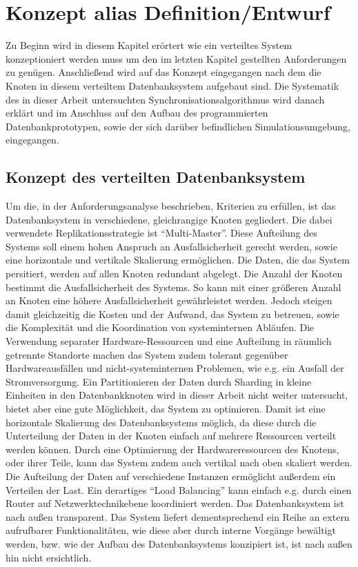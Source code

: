 \documentclass[a4paper,11pt,oneside,%
headsepline,												%
footsepline,												%
bibtotocnumbered									%
]{scrreprt}
\begin{document}
\chapter{Konzept alias Definition/Entwurf}
Zu Beginn wird in diesem Kapitel erörtert wie ein verteiltes System konzeptioniert werden muss um den im letzten Kapitel gestellten Anforderungen zu genügen. Anschließend wird auf das Konzept eingegangen nach dem die Knoten in diesem verteiltem Datenbanksystem aufgebaut sind. Die Systematik des in dieser Arbeit untersuchten Synchronisationsalgorithmus wird danach erklärt und im Anschluss auf den Aufbau des programmierten Datenbankprototypen, sowie der sich darüber befindlichen Simulationsumgebung, eingegangen.

\section{Konzept des verteilten Datenbanksystem}
\label{sec:DBSystemConcept} 
Um die, in der Anforderungsanalyse beschrieben, Kriterien zu erfüllen, ist das Datenbanksystem  in verschiedene, gleichrangige Knoten gegliedert. Die dabei verwendete Replikationsstrategie ist \enquote{Multi-Master}. Diese Aufteilung des Systems  soll einem hohen Anspruch an Ausfallsicherheit gerecht werden, sowie eine horizontale und vertikale Skalierung ermöglichen. Die Daten, die das System persitiert, werden auf allen Knoten redundant abgelegt. Die Anzahl der Knoten bestimmt die Ausfallsicherheit des Systems. So kann mit einer größeren Anzahl an Knoten eine höhere Ausfallsicherheit gewährleistet werden. Jedoch steigen damit gleichzeitig die Kosten und der Aufwand, das System zu betreuen, sowie die Komplexität und die Koordination von systeminternen Abläufen. Die Verwendung separater Hardware-Ressourcen und eine Aufteilung in räumlich getrennte Standorte machen das System zudem tolerant gegenüber Hardwareausfällen und nicht-systeminternen Problemen, wie e.g. ein Ausfall der Stromversorgung. Ein Partitionieren der Daten durch Sharding in kleine Einheiten in den Datenbankknoten wird in dieser Arbeit nicht weiter untersucht, bietet aber eine gute Möglichkeit, das System zu optimieren. Damit ist eine horizontale Skalierung des Datenbanksystems möglich, da diese durch die Unterteilung der Daten in der Knoten einfach auf mehrere Ressourcen verteilt werden können. Durch eine Optimierung der Hardwareressourcen des Knotens, oder ihrer Teile, kann das System zudem auch vertikal nach oben skaliert werden. Die Aufteilung der Daten auf verschiedene Instanzen ermöglicht außerdem ein Verteilen der Last. Ein derartiges \enquote{Load Balancing} kann einfach e.g. durch einen Router auf Netzwerktechnikebene koordiniert werden. Das Datenbanksystem ist nach außen transparent. Das System liefert dementsprechend ein Reihe an extern aufrufbarer Funktionalitäten, wie diese aber durch interne Vorgänge bewältigt werden, bzw. wie der Aufbau des Datenbanksystems konzipiert ist, ist nach außen hin nicht ersichtlich.
\end{document}
